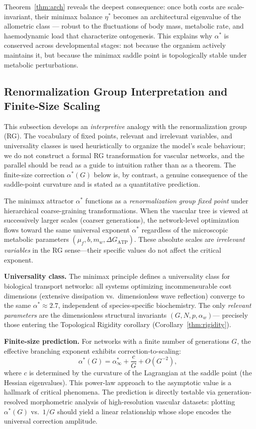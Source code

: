 Theorem~\ref{thm:arch} reveals the deepest consequence: once both costs are
scale-invariant, their minimax balance $\eta^*$ becomes an architectural
eigenvalue of the allometric class --- robust to the fluctuations of body
mass, metabolic rate, and haemodynamic load that characterize ontogenesis. This
explains why $\alpha^*$ is conserved across developmental stages: not because
the organism actively maintains it, but because the minimax saddle point is
topologically stable under metabolic perturbations.

\subsection{Renormalization Group Interpretation and Finite-Size Scaling}

This subsection develops an \emph{interpretive} analogy with the
renormalization group (RG). The vocabulary of fixed points, relevant and
irrelevant variables, and universality classes is used heuristically to organize
the model's scale behaviour; we do not construct a formal RG transformation for
vascular networks, and the parallel should be read as a guide to intuition
rather than as a theorem. The finite-size correction $\alpha^*(G)$ below is, by
contrast, a genuine consequence of the saddle-point curvature and is stated as a
quantitative prediction.

The minimax attractor $\alpha^*$ functions as a \emph{renormalization group
fixed point} under hierarchical coarse-graining transformations. When the
vascular tree is viewed at successively larger scales (coarser generations), the
network-level optimization flows toward the same universal exponent $\alpha^*$
regardless of the microscopic metabolic parameters $(\mu_f, b, m_w, \Delta
G_{\mathrm{ATP}})$. These absolute scales are \emph{irrelevant variables} in the
RG sense—their specific values do not affect the critical exponent.

\textbf{Universality class.} The minimax principle defines a universality class
for biological transport networks: all systems optimizing incommensurable cost
dimensions (extensive dissipation vs.\ dimensionless wave reflection) converge
to the same $\alpha^* \approx 2.7$, independent of species-specific
biochemistry. The only \emph{relevant parameters} are the dimensionless
structural invariants $(G, N, p, \alpha_w)$— precisely those entering the
Topological Rigidity corollary (Corollary~\ref{thm:rigidity}).

\textbf{Finite-size prediction.} For networks with a finite number of
generations $G$, the effective branching exponent exhibits
correction-to-scaling:
\begin{equation}
\alpha^*(G) = \alpha^*_\infty + \frac{c}{G} + O(G^{-2}),
\end{equation}
where $c$ is determined by the curvature of the Lagrangian at the saddle point
(the Hessian eigenvalues). This power-law approach to the asymptotic value is a
hallmark of critical phenomena. The prediction is directly testable via
generation-resolved morphometric analysis of high-resolution vascular datasets:
plotting $\alpha^*(G)$ vs.\ $1/G$ should yield a linear relationship whose slope
encodes the universal correction amplitude.

